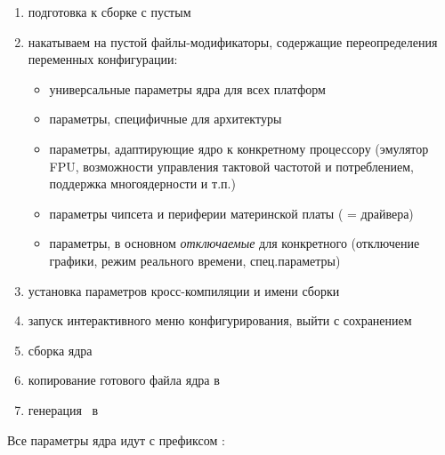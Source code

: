 \bigskip
\begin{enumerate}[nosep]
  \item подготовка к сборке с пустым 
  \item накатываем на пустой  файлы-модификаторы, содержащие
  переопределения переменных конфигурации:
  \begin{itemize}[nosep]
    \item {} универсальные параметры ядра для всех платформ
    \item {} параметры, специфичные для архитектуры
    \item {} параметры, адаптирующие ядро к конкретному процессору
    (эмулятор FPU, возможности управления тактовой частотой и потреблением,
    поддержка многоядерности и т.п.)
    \item {} параметры чипсета и периферии материнской платы
    ( = драйвера)
    \item {} параметры, в основном \emph{отключаемые} для конкретного
     (отключение графики, режим реального времени,
    спец.параметры)
  \end{itemize}
  \item установка параметров кросс-компиляции и имени сборки
  \item запуск интерактивного меню конфигурирования, выйти с сохранением
  \item сборка ядра
  \item копирование готового файла ядра в 
  \item генерация \ в 
\end{enumerate}

\bigskip
Все параметры ядра идут с префиксом :

